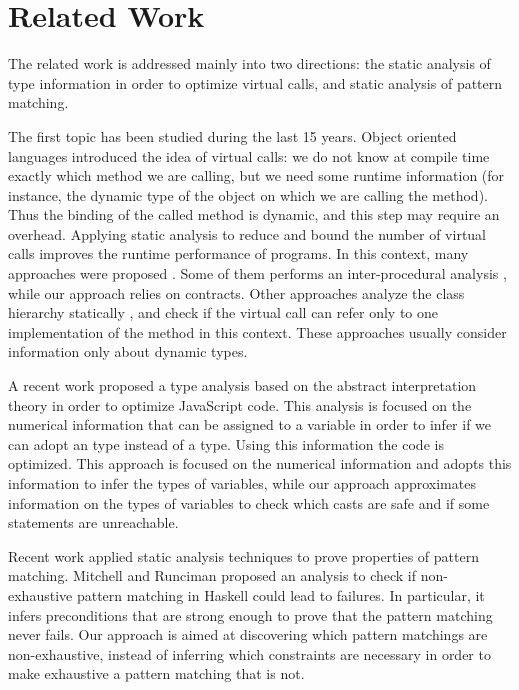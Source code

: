 \documentclass{llncs}
\begin{document}
\section{Related Work}
\label{sect:relatedwork}

The related work is addressed mainly into two directions: the static analysis of type information in order to optimize virtual calls, and static analysis of pattern matching.

The first topic has been studied during the last 15 years. Object oriented languages introduced the idea of virtual calls: we do not know at compile time exactly which method we are calling, but we need some runtime information (for instance, the dynamic type of the object on which we are calling the method). Thus the binding of the called method is dynamic, and this step may require an overhead. Applying static analysis to reduce and bound the number of virtual calls improves the runtime performance of programs. In this context, many approaches were proposed \cite{BS96}. Some of them performs an inter-procedural analysis \cite{KC07}, while our approach relies on contracts. Other approaches analyze the class hierarchy statically \cite{DGC95}, and check if the virtual call can refer only to one implementation of the method in this context. These approaches usually consider information only about dynamic types.

A recent work \cite{LH10} proposed a type analysis based on the abstract interpretation theory in order to optimize JavaScript code. This analysis is focused on the numerical information that can be assigned to a variable in order to infer if we can adopt an  type instead of a  type. Using this information the code is optimized. This approach is focused on the numerical information and adopts this information to infer the types of variables, while our approach approximates information on the types of variables to check which casts are safe and if some statements are unreachable.

Recent work applied static analysis techniques to prove properties of pattern matching. Mitchell and Runciman \cite{MR08} proposed an analysis to check if non-exhaustive pattern matching in Haskell could lead to failures. In particular, it infers preconditions that are strong enough to prove that the pattern matching never fails. Our approach is aimed at discovering which pattern matchings are non-exhaustive, instead of inferring which constraints are necessary in order to make exhaustive a pattern matching that is not.
\end{document}
